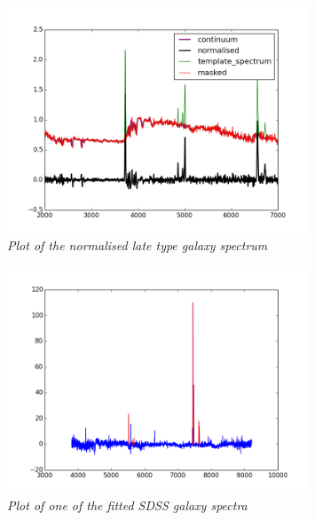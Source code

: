 \documentclass{literature}
\begin{document}
\begin{figure}[!htp]
\centering
\includegraphics[width=0.8\textwidth]{template_spectrum.png}
\caption{\footnotesize{\emph{Plot of the normalised late type galaxy spectrum}}}
\label{fig:norm_temp}
\end{figure}

\begin{figure}[!htp]
\centering
\includegraphics[width=0.8\textwidth]{fitted_spectrum.png}
\caption{\footnotesize{\emph{Plot of one of the fitted SDSS galaxy spectra}}}
\label{fig:fit_spec}
\end{figure}
\end{document}
